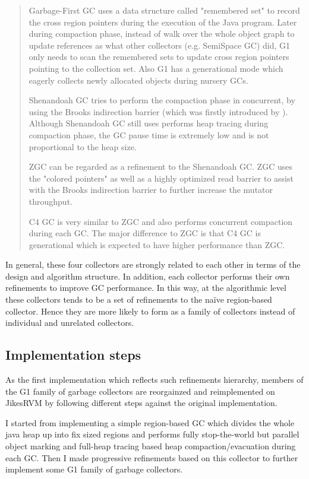 \begin{quote}
  Garbage-First GC uses a data structure called "remembered set" to record the
  cross region pointers during the execution of the Java program.
  Later during compaction phase, instead of walk over the whole object graph to update
  references as what other collectors (e.g. SemiSpace GC) did, G1 only needs to scan the
  remembered sets to update cross region pointers pointing to the collection set.
  Also G1 has a generational mode which eagerly collects newly allocated objects
  during nursery GCs.

  Shenandoah GC tries to perform the compaction phase in concurrent, by using the
  Brooks indirection barrier (which was firstly introduced by \cite{brooks1984trading}).
  Although Shenandoah GC still uses performs heap tracing during compaction phase,
  the GC pause time is extremely low and is not proportional to the heap size.

  ZGC can be regarded as a refinement to the Shenandoah GC. ZGC uses the "colored pointers"
  as well as a highly optimized read barrier to assist with the Brooks indirection barrier
  to further increase the mutator throughput.

  C4 GC is very similar to ZGC and also performs concurrent compaction during each
  GC. The major difference to ZGC is that C4 GC is generational which is expected
  to have higher performance than ZGC.
\end{quote}

In general, these four collectors are strongly related to each other in terms of
the design and algorithm structure. In addition, each collector performs their
own refinements to improve GC performance. In this way, at the algorithmic level
these collectors tends to be a set of refinements to the naïve region-based collector.
Hence they are more likely to form as a family of collectors
instead of individual and unrelated collectors.

\subsection{Implementation steps}

As the first implementation which reflects such refinements hierarchy,
members of the G1 family of garbage collectors are reorgainzed and reimplemented on JikesRVM
by following different steps against the original implementation. 

I started from implementing a simple region-based GC which divides the whole java heap
up into fix sized regions and performs fully stop-the-world but parallel object marking
and full-heap tracing based heap compaction/evacuation during each GC.
Then I made progressive refinements based on this collector to further implement some G1 family of garbage collectors.

